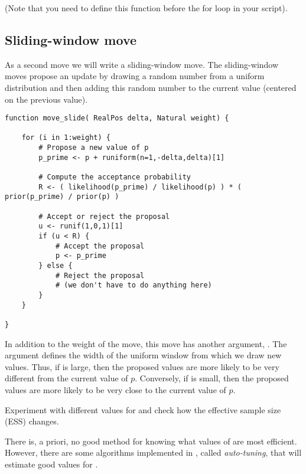 (Note that you need to define this function before the for loop in your script).


\subsection{Sliding-window move}
As a second move we will write a sliding-window move.
The sliding-window moves propose an update by drawing a random number from a uniform distribution and then adding this random number to the current value (\IE centered on the previous value).
{\tt \begin{snugshade*}
\begin{lstlisting}    
function move_slide( RealPos delta, Natural weight) {

    for (i in 1:weight) {
        # Propose a new value of p
        p_prime <- p + runiform(n=1,-delta,delta)[1]

        # Compute the acceptance probability
        R <- ( likelihood(p_prime) / likelihood(p) ) * ( prior(p_prime) / prior(p) )
    
        # Accept or reject the proposal
        u <- runif(1,0,1)[1]
        if (u < R) {
            # Accept the proposal
            p <- p_prime
        } else {
            # Reject the proposal
            # (we don't have to do anything here)
        }
    }
    
}
\end{lstlisting}
\end{snugshade*}}
In addition to the weight of the move, this move has another argument, .
The argument  defines the width of the uniform window from which we draw new values.
Thus, if  is large, then the proposed values are more likely to be very different from the current value of $p$.
Conversely, if  is small, then the proposed values are more likely to be very close to the current value of $p$.

\impmark Experiment with different values for  and check how the effective sample size (ESS) changes.

There is, a priori, no good method for knowing what values of  are most efficient.
However, there are some algorithms implemented in \RevBayes, called \emph{auto-tuning}, that will estimate good values for .

